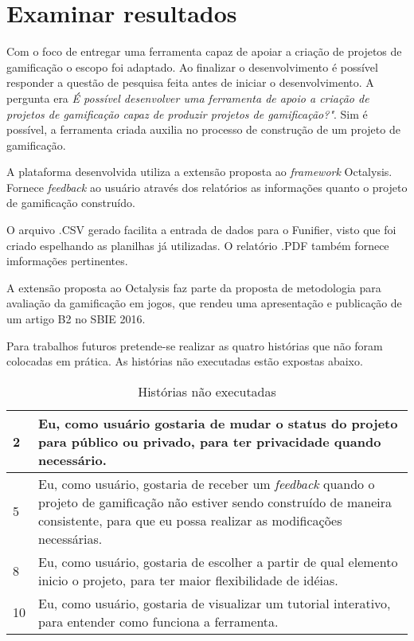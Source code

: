 \section {Examinar resultados}


Com o foco de entregar uma ferramenta capaz de apoiar a criação de projetos de gamificação o escopo foi adaptado. Ao finalizar o desenvolvimento é possível responder a questão de pesquisa feita antes de iniciar o desenvolvimento. A pergunta era \textit{É possível desenvolver uma ferramenta de apoio a criação de projetos de gamificação capaz de produzir projetos de gamificação?"}. Sim é possível, a ferramenta criada auxilia no processo de construção de um projeto de gamificação.


A plataforma desenvolvida utiliza a extensão proposta ao \textit{framework} Octalysis. Fornece \textit{feedback} ao usuário através dos relatórios as informações quanto o projeto de gamificação construído.

O arquivo .CSV gerado facilita a entrada de dados para o Funifier, visto que foi criado espelhando as planilhas já utilizadas. O relatório .PDF também fornece imformações pertinentes. 

A extensão proposta ao Octalysis faz parte da proposta de metodologia para avaliação da gamificação em jogos, que rendeu uma apresentação e publicação de um artigo B2 no SBIE 2016.

Para trabalhos futuros pretende-se realizar as quatro histórias que não foram colocadas em prática. As histórias não executadas estão expostas abaixo.

\begin{table}[!htpb]
\centering
\begin{tabular}{|p{1.5cm}|p{12cm}|} \hline

 2 & Eu, como usuário gostaria de mudar o status do projeto para público ou privado,  para ter privacidade quando necessário. \\ \hline

 5 & Eu, como usuário, gostaria de receber um \textit{feedback} quando o projeto de gamificação não estiver sendo construído de maneira consistente, para que eu possa realizar as modificações necessárias. \\ \hline

 8 & Eu, como usuário, gostaria de escolher a partir de qual elemento inicio o projeto, para ter maior flexibilidade de idéias. \\ \hline

 10 & Eu, como usuário, gostaria de visualizar um tutorial interativo, para entender como funciona a ferramenta. \\ \hline

 
\end{tabular}
\caption{Histórias não executadas\label{nfeitas}
}
\end{table} 





